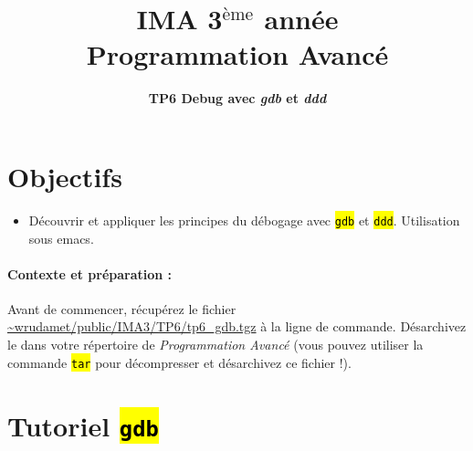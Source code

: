 \documentclass[final, pdftex, a4paper, openbib, ]{article}
\title{IMA 3$^{\mbox{\`eme}}$ année\\ Programmation Avancé
}
\author{\huge \textbf{TP6 Debug avec \textit{gdb} et \textit{ddd}}}
\date{}
\let\OldTexttt\texttt
\renewcommand{\texttt}[1]{\OldTexttt{\hl{#1}}}
\begin{document}
\posttitle{\par\end{center}}
\setlength{\droptitle}{-45pt}
\maketitle

\vspace{-1.7cm}
\section{Objectifs}

\begin{itemize}
	\item Découvrir et appliquer les principes du débogage avec \texttt{gdb} et \texttt{ddd}. Utilisation sous emacs.
\end{itemize}


\paragraph{Contexte et préparation : } Avant de commencer, récupérez le fichier \url{~wrudamet/public/IMA3/TP6/tp6_gdb.tgz} à la ligne de commande. Désarchivez le dans votre répertoire de \textit{Programmation Avancé} (vous pouvez utiliser la commande \texttt{tar} pour décompresser et désarchivez ce fichier !).



\section{Tutoriel \texttt{gdb}}
\end{document}
